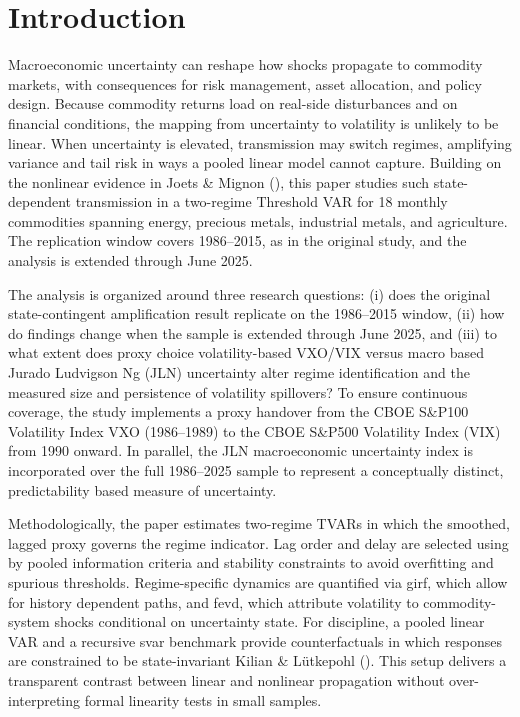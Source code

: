 \documentclass[
  11pt,
]{article}
\begin{document}
{}
\small
\printacronyms[
  name=List of Abbreviations,
  include=abbrev,
  heading=section*,
  display=used,
  pages={display=first, name=false, seq/use=false}
]
\acresetall
\clearpage

\setcounter{page}{1}

\section{Introduction}\label{introduction}

Macroeconomic uncertainty can reshape how shocks propagate to commodity markets, with consequences for risk management, asset allocation, and policy design. Because commodity returns load on real-side disturbances and on financial conditions, the mapping from uncertainty to volatility is unlikely to be linear. When uncertainty is elevated, transmission may switch regimes, amplifying variance and tail risk in ways a pooled linear model cannot capture. Building on the nonlinear evidence in Joets \& Mignon (), this paper studies such state-dependent transmission in a two-regime Threshold VAR for 18 monthly commodities spanning energy, precious metals, industrial metals, and agriculture. The replication window covers 1986--2015, as in the original study, and the analysis is extended through June 2025.

The analysis is organized around three research questions: (i) does the original state-contingent amplification result replicate on the 1986--2015 window, (ii) how do findings change when the sample is extended through June 2025, and (iii) to what extent does proxy choice volatility-based VXO/VIX versus macro based Jurado Ludvigson Ng (JLN) uncertainty alter regime identification and the measured size and persistence of volatility spillovers?
To ensure continuous coverage, the study implements a proxy handover from the CBOE S\&P100 Volatility Index VXO (1986--1989) to the CBOE S\&P500 Volatility Index (VIX) from 1990 onward. In parallel, the JLN macroeconomic uncertainty index is incorporated over the full 1986--2025 sample to represent a conceptually distinct, predictability based measure of uncertainty.

Methodologically, the paper estimates two-regime TVARs in which the smoothed, lagged proxy governs the regime indicator. Lag order and delay are selected using by pooled information criteria and stability constraints to avoid overfitting and spurious thresholds. Regime-specific dynamics are quantified via \ac{girf}, which allow for history dependent paths, and \ac{fevd}, which attribute volatility to commodity-system shocks conditional on uncertainty state. For discipline, a pooled linear VAR and a recursive \ac{svar} benchmark provide counterfactuals in which responses are constrained to be state-invariant Kilian \& Lütkepohl (). This setup delivers a transparent contrast between linear and nonlinear propagation without over-interpreting formal linearity tests in small samples.
\end{document}
